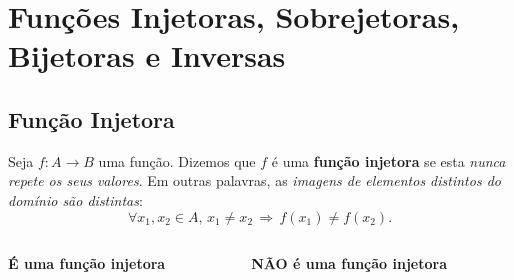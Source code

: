 \section{Funções Injetoras, Sobrejetoras, Bijetoras e Inversas}

\subsection{Função Injetora}
\begin{frame}
  \begin{definition}
    Seja $f:A\rightarrow B$ uma função. Dizemos que $f$ é uma \textbf{função injetora} se esta \emph{nunca repete os seus valores}. Em outras palavras, as \emph{imagens de elementos distintos do domínio são distintas}:
    \begin{equation*}
      \forall x_{1},x_{2}\in A, \,x_{1}\not=x_{2} \,\Rightarrow\, f(x_{1})\not=f(x_{2}).
    \end{equation*}
  \end{definition}
  \begin{columns}[onlytextwidth]
    \begin{column}{0.45\textwidth}\vspace*{-0.45cm}
      \begin{figure}
      \end{figure}
      \begin{center}
        \textbf{É uma função injetora}
      \end{center}
    \end{column}
    \begin{column}{0.45\textwidth}\vspace*{-0.45cm}
      \begin{figure}
      \end{figure}
      \begin{center}
        \textbf{NÃO é uma função injetora}
      \end{center}
    \end{column}
  \end{columns}
\end{frame}

